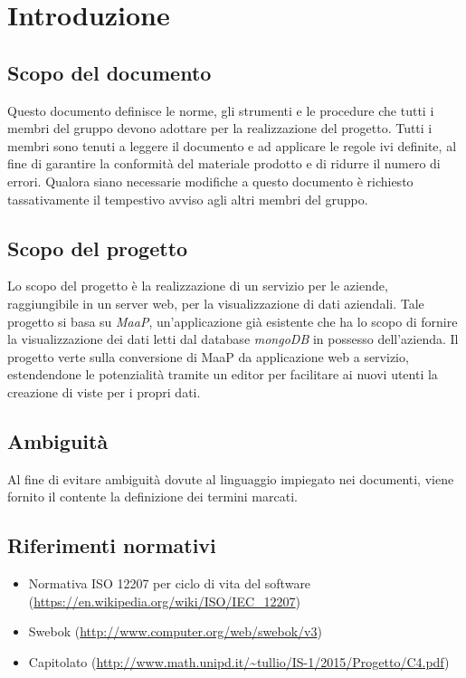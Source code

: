 \section{Introduzione}
\subsection{Scopo del documento}
Questo documento definisce le norme, gli strumenti e le procedure che tutti i membri del gruppo devono adottare per la realizzazione del progetto. Tutti i membri sono tenuti a leggere il documento e ad applicare le regole ivi definite, al fine di garantire la conformità del materiale prodotto e di ridurre il numero di errori. Qualora siano necessarie modifiche a questo documento è richiesto tassativamente il tempestivo avviso agli altri membri del gruppo.


\subsection{Scopo del progetto}
Lo scopo del progetto è la realizzazione di un servizio per le aziende, raggiungibile in un server web, per la visualizzazione di dati aziendali. Tale progetto si basa su \textit{MaaP}, un'applicazione già esistente che ha lo scopo di fornire la visualizzazione dei dati letti dal database \textit{mongoDB} in possesso dell'azienda. Il progetto verte sulla conversione di MaaP da applicazione web a servizio, estendendone le potenzialità tramite un editor per facilitare ai nuovi utenti la creazione di viste per i propri dati.

\subsection{Ambiguit\`a}
Al fine di evitare ambiguità dovute al linguaggio impiegato nei documenti, viene fornito il \Glossario contente la definizione dei termini marcati.


\subsection{Riferimenti normativi}
\begin{itemize}
\item Normativa ISO 12207 per ciclo di vita del software (\url{https://en.wikipedia.org/wiki/ISO/IEC_12207})
\item Swebok (\url{http://www.computer.org/web/swebok/v3})
\item Capitolato (\url{http://www.math.unipd.it/~tullio/IS-1/2015/Progetto/C4.pdf})
\end{itemize}

